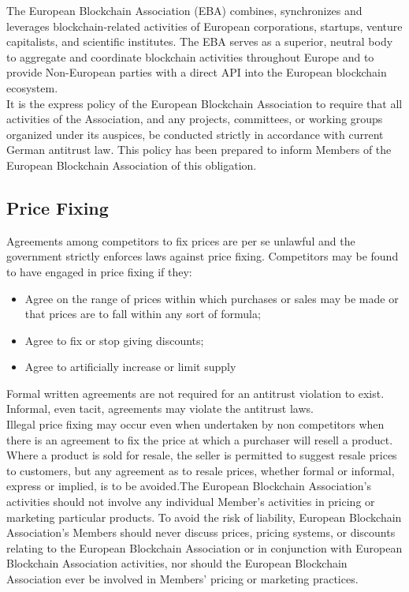 \documentclass{article}
\begin{document}
The European Blockchain Association (EBA) combines, synchronizes and leverages blockchain-related activities of European corporations, startups, venture capitalists, and scientific institutes. 
The EBA serves as a superior, neutral body to aggregate and coordinate blockchain activities throughout Europe and to provide Non-European parties with a direct API into the European blockchain ecosystem. \\
It is the express policy of the European Blockchain Association to require that all activities of the Association, and any projects, committees, or working groups organized under its auspices, be conducted strictly in accordance with current German antitrust law. This policy has been prepared to inform Members of the European Blockchain Association of this obligation.

\subsection{Price Fixing}

Agreements among competitors to fix prices are per se unlawful and the government strictly enforces laws against price fixing. Competitors may be found to have engaged in price fixing if they: 

\begin{itemize}
	\item Agree on the range of prices within which purchases or sales may be made or that prices are to fall within any sort of formula;
	\item Agree to fix or stop giving discounts; 
	\item Agree to artificially increase or limit supply
\end{itemize}

Formal written agreements are not required for an antitrust violation to exist. Informal, even tacit, agreements may violate the antitrust laws. \\
Illegal price fixing may occur even when undertaken by non competitors when there is an agreement to fix the price at which a purchaser will resell a product. 
Where a product is sold for resale, the seller is permitted to suggest resale prices to customers, but any agreement as to resale prices, whether formal or informal, express or implied, is to be avoided.The European Blockchain Association’s activities should not involve any individual Member’s activities in pricing or marketing particular products. 
To avoid the risk of liability, European Blockchain Association’s Members should never discuss prices, pricing systems, or discounts relating to the European Blockchain Association or in conjunction with European Blockchain Association activities, nor should the European Blockchain Association ever be involved in Members’ pricing or marketing practices.
\end{document}
